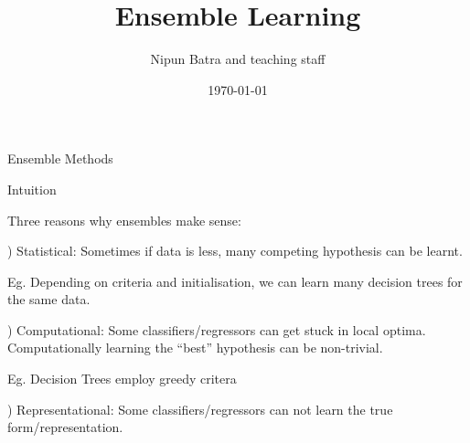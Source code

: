 \documentclass{beamer}
\title{Ensemble Learning}
\date{\today}
\author{Nipun Batra and teaching staff}
\institute{IIT Gandhinagar}
\begin{document}
\maketitle

\begin{frame}{Ensemble Methods}
\end{frame}


\begin{frame}{Intuition}

  Three reasons why ensembles make sense:

  ) Statistical: Sometimes if data is less, many competing hypothesis can be learnt.

  \pause Eg. Depending on criteria and initialisation, we can learn many decision trees for the same data.

  ) Computational: Some classifiers/regressors can get stuck in local optima. Computationally learning the ``best'' hypothesis can be non-trivial.

  \pause Eg. Decision Trees employ greedy critera

  ) Representational: Some classifiers/regressors can not learn the true form/representation.

\end{frame}
\end{document}
